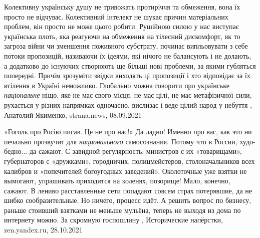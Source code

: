 Колективну українську душу не тривожать протиріччя та обмеження, вона їх просто
не відчуває. Колективний інтелект не шукає причин матеріальних проблем, він
просто не може цього робити. Рушійною силою у нас виступає українська плоть,
яка реагуючи на обмеження на тілесний дискомфорт, як то загроза війни чи
зменшення поживного субстрату, починає випльовувати з себе потоки пропозицій,
називаючи їх ідеями, які нічого не балансують і не долають, а додатково до
існуючих створюють ще більші нові проблеми, за якими губляться попередні.
Причім зрозуміти звідки виходять ці пропозиції і хто відповідає за їх втілення
в Україні неможливо.  Глобально можна говорити про українське \emph{національне} ніщо,
яке не має свого місця, не має цілі, не має метафізичної сили, рухається у
різних напрямках одночасно, вислизає і веде цілий народ у небуття
, Анатолий Якименко, strana.news, 08.09.2021


«Гоголь про Росію писав. Це не про нас!» Да ладно! Именно про вас, как это ни печально прозвучит для
\emph{национального} самосознания. Потому что в России, худо-бедно... да сажают. С
завидной регулярность: министров с их «товарищами», губернаторов с «дружками»,
городничих, полицмейстеров, столоначальников всех калибров и «попечителей
богоугодных заведений». Околоточные уже взятки не вымогают, упрашивать
приходится на коленях, позорище!  Мало, конечно, сажают. В лениво расставленные
сети попадают совсем страх потерявшие, да не шибко сообразительные. Но ничего,
процесс идёт. А решить вопрос по бизнесу, раньше стоивший взятками не меньше
мульёна, теперь не выходя из дома по интернету можно. За скромную госпошлину
, 
Исторические напёрстки, zen.yandex.ru, 28.10.2021


